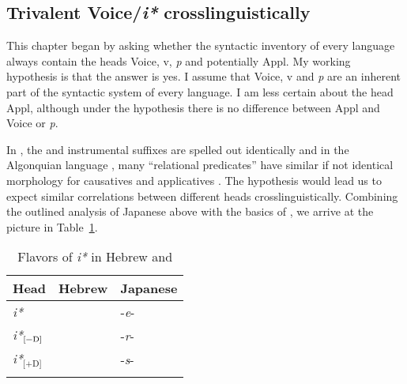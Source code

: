 \begin{exe}
\begin{xlist}
\begin{xlist}
\begin{xlist}
\begin{xlist}
\begin{xlist}
\begin{xlist}
\begin{exe}
\begin{xlist}
\begin{exe}
\begin{exe}
\begin{xlist}
\begin{exe}
\begin{exe}
\begin{xlist}
\begin{exe}
\begin{xlist}
\begin{exe}
\begin{xlist}
\begin{exe}
\begin{xlist}
\begin{exe}
\begin{xlist}
	\subsection{Trivalent Voice/\textit{i*} crosslinguistically} \label{i:i:ay} \label{r1:g:1}
This chapter began by asking whether the syntactic inventory of every language always contain the heads Voice, v, \textit{p} and potentially Appl. My working hypothesis is that the answer is yes. I assume that Voice, v and \emph{p} are an inherent part of the syntactic system of every language. I am less certain about the  head Appl, although under the \textit{} hypothesis there is no difference between Appl and Voice or \textit{p}. 

\hspace*{-0.66545pt}In , the  and instrumental  suffixes are spelled out identically \citep{jerro17} and in the Algonquian language , many ``relational predicates'' have similar if not identical morphology for causatives and applicatives \citep[Section~2.3.7.1]{quinn06phd}. The \emph{} hypothesis would lead us to expect similar correlations between different heads crosslinguistically. Combining the outlined analysis of Japanese above with the basics of \emph{}, we arrive at the picture in Table~\ref{table:heads-langs2}.

\begin{table}
	\begin{tabular}{lll}
 \lsptoprule
	Head 		& Hebrew 	  		& Japanese\\\midrule
	\emph{i*}   	& \tkal          & -\emph{e}-\\
	\emph{i*}$_{\text{[\textminus{}D]}}$ 	& \tnif 		& -\emph{r}-\\
	\emph{i*}$_{\text{[+D]}}$	& \thif		& -\emph{s}-\\
\lspbottomrule
 	\end{tabular}
	\caption{Flavors of \textit{i*} in Hebrew and \label{table:heads-langs2}}
\end{table}


\end{xlist}
\end{exe}
\end{xlist}
\end{exe}
\end{xlist}
\end{exe}
\end{xlist}
\end{exe}
\end{xlist}
\end{exe}
\end{exe}
\end{xlist}
\end{exe}
\end{exe}
\end{xlist}
\end{exe}
\end{xlist}
\end{xlist}
\end{xlist}
\end{xlist}
\end{xlist}
\end{xlist}
\end{exe}
